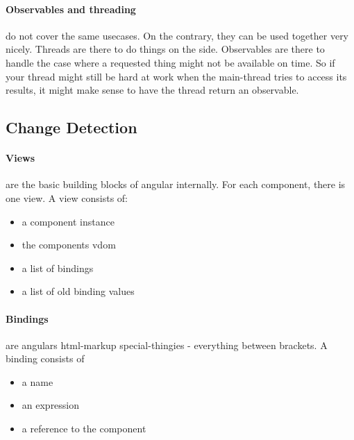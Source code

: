 \paragraph{Observables and threading} do not cover the same usecases. On the contrary, they can be used together very nicely. Threads are there to do things on the side. Observables are there to handle the case where a requested thing might not be available on time. So if your thread might still be hard at work when the main-thread tries to access its results, it might make sense to have the thread return an observable. 


\subsection{Change Detection}

\paragraph{Views} are the basic building blocks of angular internally.
For each component, there is one view. 
A view consists of: 
\begin{itemize}
  \item a component instance
  \item the components vdom
  \item a list of bindings
  \item a list of old binding values
\end{itemize}

\paragraph{Bindings} are angulars html-markup special-thingies - everything between brackets. 
A binding consists of 
\begin{itemize}
  \item a name
  \item an expression
  \item a reference to the component
\end{itemize}

